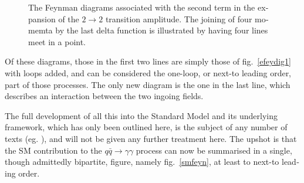 \begin{english}
\begin{figure}[hbt]
\begin{footnotesize}
\begin{center}
\vspace{.5em}


\vspace{.5em}


\end{center}\end{footnotesize}
\caption{The Feynman diagrams associated with the second term in the expansion of the $2\rightarrow2$ transition amplitude. The joining of four momemta by the last delta function is illustrated by having four lines meet in a point.
\label{efeydig2}}
\end{figure}

Of these diagrams, those in the first two lines are simply those of fig.~\ref{efeydig1} with loops added, and can be considered the one-loop, or next-to leading order, part of those processes. The only new diagram is the one in the last line, which describes an interaction between the two ingoing fields.

The full development of all this into the Standard Model and its underlying framework, which has only been outlined here, is the subject of any number of texts (eg. \cite{srednicki}), and will not be given any further treatment here. The upshot is that the SM contribution to the $q\bar q\rightarrow\gamma\gamma$ process can now be summarised in a single, though admittedly bipartite, figure, namely fig.~\ref{smfeyn}, at least to next-to leading order.


\end{english}
